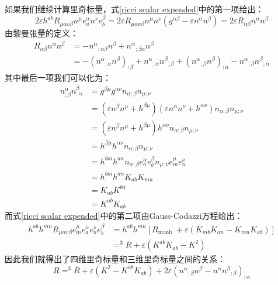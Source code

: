 \documentclass[hyperref, UTF8, a4paper]{ctexart}
\begin{document}
如果我们继续计算里奇标量，式\ref{ricci scalar expended}中的第一项给出：
\begin{equation*}
	2\varepsilon h^{ab} R_{\mu \alpha \nu \beta } n^{\mu } e_{a}^{\alpha } n^{\nu } e_{b}^{\beta } =2\varepsilon R_{\mu \alpha \nu \beta } n^{\mu } n^{\nu } (g^{\alpha \beta } -\varepsilon n^{\alpha } n^{\beta } )=2\varepsilon R_{\alpha \beta } n^{\alpha } n^{\beta }
\end{equation*}
由黎曼张量的定义：
\begin{equation*}
	\begin{aligned}
		R_{\alpha \beta } n^{\alpha } n^{\beta } & =-n^{\alpha }{}_{;\alpha \beta } n^{\beta } +n^{\alpha }{}_{;\beta \alpha } n^{\beta }\\
		& =-(n^{\alpha }{}_{;\alpha } n^{\beta } )_{;\beta } +n^{\alpha }{}_{;\alpha } n^{\beta }{}_{;\beta } +(n^{\alpha }{}_{;\beta } n^{\beta } )_{;\alpha } -n^{\alpha }{}_{;\beta } n^{\beta }{}_{;\alpha }
	\end{aligned}
\end{equation*}
其中最后一项我们可以化为：
\begin{equation*}
	\begin{aligned}
		n_{;\beta }^{\alpha } n_{;\alpha }^{\beta } & =g^{\beta \mu } g^{\alpha \nu } n_{\alpha ;\beta } n_{\mu ;\nu }\\
		& =(\varepsilon n^{\beta } n^{\mu } +h^{\beta \mu } )(\varepsilon n^{\alpha } n^{\nu } +h^{\alpha \nu } )n_{\alpha ;\beta } n_{\mu ;\nu }\\
		& =(\varepsilon n^{\beta } n^{\mu } +h^{\beta \mu } )h^{\alpha \nu } n_{\alpha ;\beta } n_{\mu ;\nu }\\
		& =h^{\beta \mu } h^{\alpha \nu } n_{\alpha ;\beta } n_{\mu ;\nu }\\
		& =h^{bm} h^{an} n_{\alpha ;\beta } e_{a}^{\alpha } e_{b}^{\beta } n_{\mu ;\nu } e_{m}^{\mu } e_{n}^{\nu }\\
		& =h^{bm} h^{an} K_{ab} K_{mn}\\
		& =K_{ab} K^{ba}\\
		& =K^{ab} K_{ab}
	\end{aligned}
\end{equation*}
而式\ref{ricci scalar expended}中的第二项由Gauss-Codazzi方程给出：
\begin{equation*}
	\begin{aligned}
		h^{ab} h^{mn} R_{\mu \alpha v\beta } e_{m}^{\mu } e_{a}^{\alpha } e_{n}^{v} e_{b}^{\beta } & =h^{ab} h^{mn}[ R_{\text{manb }} +\varepsilon ( K_{mb} K_{an} -K_{mn} K_{ab})]\\
		& =^{3} R+\varepsilon (K^{ab} K_{ab} -K^{2} )
	\end{aligned}
\end{equation*}
因此我们就得出了四维里奇标量和三维里奇标量之间的关系：
\begin{equation*}
	\boxed{R=^{3} R+\varepsilon (K^{2} -K^{ab} K_{ab} )+2\varepsilon (n^{\alpha }{}_{;\beta } n^{\beta } -n^{\alpha } n^{\beta }{}_{;\beta } )_{;\alpha }}
\end{equation*}
\end{document}
